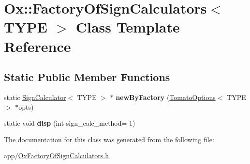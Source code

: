 \hypertarget{class_ox_1_1_factory_of_sign_calculators}{\section{Ox\-:\-:Factory\-Of\-Sign\-Calculators$<$ T\-Y\-P\-E $>$ Class Template Reference}
\label{class_ox_1_1_factory_of_sign_calculators}
}
\subsection*{Static Public Member Functions}
\begin{DoxyCompactItemize}
\item 
\hypertarget{class_ox_1_1_factory_of_sign_calculators_ac53542904959b31382d7b895346f1e80}{static \hyperlink{class_ox_1_1_sign_calculator}{Sign\-Calculator}$<$ T\-Y\-P\-E $>$ $\ast$ {\bfseries new\-By\-Factory} (\hyperlink{struct_ox_1_1_tomato_options}{Tomato\-Options}$<$ T\-Y\-P\-E $>$ $\ast$opts)}\label{class_ox_1_1_factory_of_sign_calculators_ac53542904959b31382d7b895346f1e80}

\item 
\hypertarget{class_ox_1_1_factory_of_sign_calculators_a62edbbc79a0264760f3b99e68043dd1a}{static void {\bfseries disp} (int sign\-\_\-calc\-\_\-method=-\/1)}\label{class_ox_1_1_factory_of_sign_calculators_a62edbbc79a0264760f3b99e68043dd1a}

\end{DoxyCompactItemize}


The documentation for this class was generated from the following file\-:\begin{DoxyCompactItemize}
\item 
app/\hyperlink{_ox_factory_of_sign_calculators_8h}{Ox\-Factory\-Of\-Sign\-Calculators.\-h}\end{DoxyCompactItemize}
